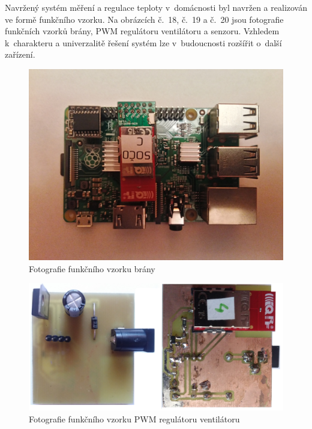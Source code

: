 \documentclass[12pt,a4paper]{article}
\begin{document}

Navržený systém měření a regulace teploty v~domácnosti byl navržen a realizován ve formě funkčního vzorku. Na obrázcích č.~18, č.~19 a č.~20 jsou fotografie funkčních vzorků brány, PWM regulátoru ventilátoru a senzoru. Vzhledem k~charakteru a univerzalitě řešení systém lze v~budoucnosti rozšířit o~další zařízení.

\begin{figure}[H]
\centering
\label{fig:foto/brana}
\includegraphics[width = 150mm]{../img/foto/brana.jpg}
\caption{Fotografie funkčního vzorku brány}
\end{figure}

\begin{figure}[H]
\centering
\label{fig:foto/iqrf-pwm-fan-controller}
\includegraphics[width = 150mm]{../img/foto/iqrf-pwm-fan-controller.jpg}
\caption{Fotografie funkčního vzorku PWM regulátoru ventilátoru}
\end{figure}
\end{document}

